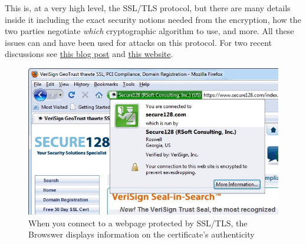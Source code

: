 This is, at a very high level, the SSL/TLS protocol, but there are many
details inside it including the exact security notions needed from the
encryption, how the two parties negotiate \emph{which} cryptographic
algorithm to use, and more. All these issues can and have been used for
attacks on this protocol. For two recent discussions see
\href{http://blog.cryptographyengineering.com/2013/12/how-does-nsa-break-ssl.html}{this
blog post} and \href{https://weakdh.org/}{this website}.


\begin{figure}
\centering
\includegraphics[width=\textwidth, height=0.25\paperheight, keepaspectratio]{../figure/certificate.jpg}
\caption{When you connect to a webpage protected by SSL/TLS, the
Browswer displays information on the certificate's authenticity}
\label{tmplabelfig}
\end{figure}


